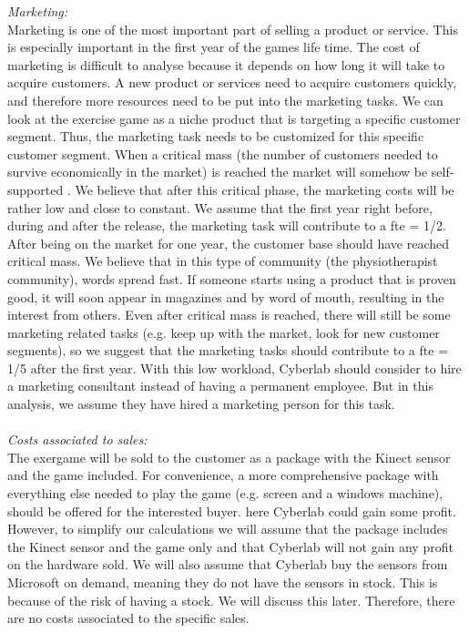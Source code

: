 \emph{Marketing:}\\
Marketing is one of the most important part of selling a product or service. This is especially important in the first year of the games life time. The cost of marketing is difficult to analyse because it depends on how long it will take to acquire customers. A new product or services need to acquire customers quickly, and therefore more resources need to be put into the marketing tasks. We can look at the exercise game as a niche product that is targeting a specific customer segment. Thus, the marketing task needs to be customized for this specific customer segment. When a critical mass (the number of customers needed to survive economically in the market) is reached the market will somehow be self-supported \cite{informationrules}. We believe that after this critical phase, the marketing costs will be rather low and close to constant. We assume that the first year right before, during and after the release, the marketing task will contribute to a \ac{fte} = 1/2. After being on the market for one year, the customer base should have reached critical mass.  We believe that in this type of community (the physiotherapist community), words spread fast. If someone starts using a product that is proven good, it will soon appear in magazines and by word of mouth, resulting in the interest from others. Even after critical mass is reached, there will still be some marketing related tasks (e.g. keep up with the market, look for new customer segments), so we suggest that the marketing tasks should contribute to a \ac{fte} = 1/5 after the first year. With this low workload, Cyberlab should consider to hire a marketing consultant instead of having a permanent employee. But in this analysis, we assume they have hired a marketing person for this task. \\ \\
\emph{Costs associated to sales:}\\
The exergame will be sold to the customer as a package with the Kinect sensor and the game included. For convenience, a more comprehensive package with everything else needed to play the game (e.g. screen and a windows machine), should be offered for the interested buyer. here Cyberlab could gain some profit. However, to simplify our calculations we will assume that the package includes the Kinect sensor and the game only and that Cyberlab will not gain any profit on the hardware sold. We will also assume that Cyberlab buy the sensors from Microsoft on demand, meaning they do not have the sensors in stock. This is because of the risk of having a stock. We will discuss this later. Therefore, there are no costs associated to the specific sales. 

